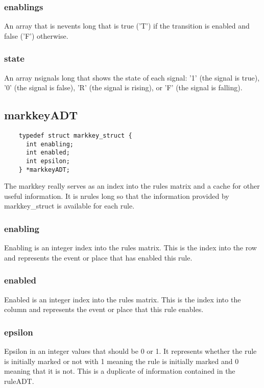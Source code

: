 \documentclass[titlepage,11pt]{article}
\begin{document}
	\subsubsection{enablings}
	An array that is nevents long that is true ('T') if the transition is enabled and false ('F') otherwise.
	
	\subsubsection{state}
	An array nsignals long that shows the state of each signal: '1' (the signal is true), '0' (the signal is false), 'R' (the signal is rising), or 'F' (the signal is falling).

  \subsection{markkeyADT}
  \begin{verbatim}
    typedef struct markkey_struct {
      int enabling;
      int enabled;
      int epsilon;
    } *markkeyADT;
  \end{verbatim}

  The markkey really serves as an index into the rules matrix and a
  cache for other useful information.  It is nrules long so that the
  information provided by markkey\_struct is available for each rule.  
  
  \subsubsection{enabling}
  Enabling is an integer index into the rules matrix.  This is the
  index into the row and represents the event or place that has
  enabled this rule.
  
  \subsubsection{enabled}
  Enabled is an integer index into the rules matrix.  This is the
  index into the column and represents the event or place that this
  rule enables.
  
  \subsubsection{epsilon}
  Epsilon in an integer values that should be 0 or 1.  It represents
  whether the rule is initially marked or not with 1 meaning the rule
  is initially marked and 0 meaning that it is not.  This is a
  duplicate of information contained in the ruleADT.
  
\end{document}
